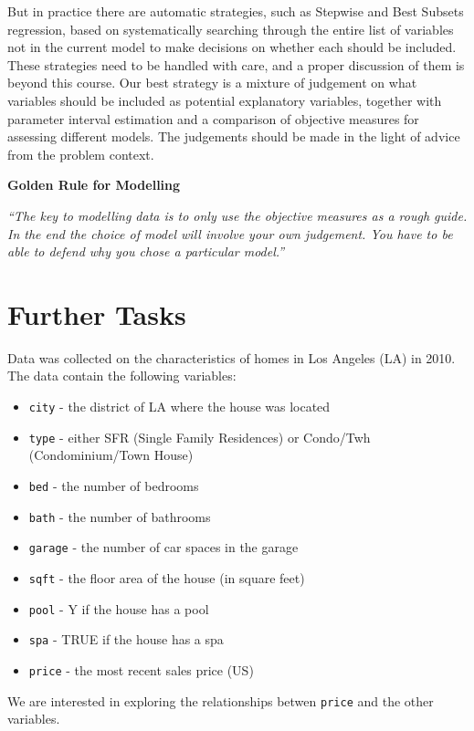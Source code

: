 \documentclass[]{article}
\providecommand{\tightlist}{%
  \setlength{\itemsep}{0pt}\setlength{\parskip}{0pt}}
\begin{document}
But in practice there are automatic strategies, such as Stepwise and
Best Subsets regression, based on systematically searching through the
entire list of variables not in the current model to make decisions on
whether each should be included. These strategies need to be handled
with care, and a proper discussion of them is beyond this course. Our
best strategy is a mixture of judgement on what variables should be
included as potential explanatory variables, together with parameter
interval estimation and a comparison of objective measures for assessing
different models. The judgements should be made in the light of advice
from the problem context.

\textbf{Golden Rule for Modelling}

\emph{``The key to modelling data is to only use the objective measures
as a rough guide. In the end the choice of model will involve your own
judgement. You have to be able to defend why you chose a particular
model.''}

\newpage

\section{Further Tasks}\label{sec:Further}

Data was collected on the characteristics of homes in Los Angeles (LA)
in 2010. The data contain the following variables:

\begin{itemize}
\tightlist
\item
  \texttt{city} - the district of LA where the house was located
\item
  \texttt{type} - either SFR (Single Family Residences) or Condo/Twh
  (Condominium/Town House)
\item
  \texttt{bed} - the number of bedrooms
\item
  \texttt{bath} - the number of bathrooms
\item
  \texttt{garage} - the number of car spaces in the garage
\item
  \texttt{sqft} - the floor area of the house (in square feet)
\item
  \texttt{pool} - Y if the house has a pool
\item
  \texttt{spa} - TRUE if the house has a spa
\item
  \texttt{price} - the most recent sales price (US)
\end{itemize}

We are interested in exploring the relationships betwen \texttt{price}
and the other variables.
\end{document}

